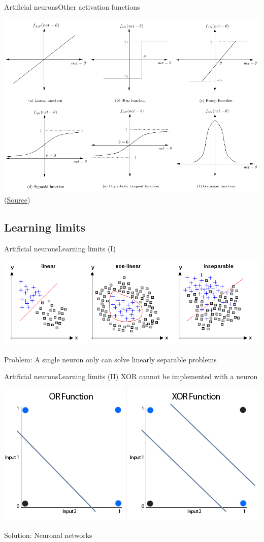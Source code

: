 \documentclass[10pt,compress]{beamer} %
\begin{document}
\begin{frame}{Artificial neurons}{Other activation functions}
\begin{center}
	\includegraphics[width=0.8\linewidth]{figs/funciones.png}\\
	\scriptsize{(\href{http://www.turingfinance.com/misconceptions-about-neural-networks/}{Source})}
\end{center}
\end{frame}

\subsection{Learning limits}
\begin{frame}{Artificial neurons}{Learning limits (I)}
	\begin{center}
	\includegraphics[width=0.9\linewidth]{figs/linear2.png}
	\end{center}
	Problem: A single neuron only can solve linearly separable problems
\end{frame}

\begin{frame}{Artificial neurons}{Learning limits (II)}
	XOR cannot be implemented with a neuron
	\begin{center}
	\includegraphics[width=0.7\linewidth]{figs/xor.jpg}
	\end{center}
	Solution: Neuronal networks
\end{frame}
\end{document}
